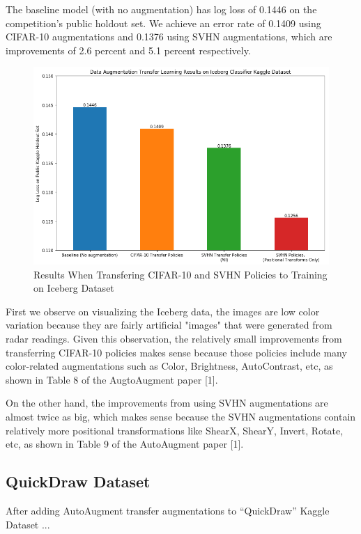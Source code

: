 \documentclass[10pt,twocolumn,letterpaper]{article}
\begin{document}
The baseline model (with no augmentation) has log loss of 0.1446 on the competition's public holdout set. We achieve an error rate of 0.1409 using CIFAR-10 augmentations and 0.1376 using SVHN augmentations, which are improvements of 2.6 percent and 5.1 percent respectively.

\begin{figure}[bhp]
\includegraphics[width=\columnwidth]{iceberg_results.png}
\caption{Results When Transfering CIFAR-10 and SVHN Policies to Training on Iceberg Dataset}
\end{figure}

First we observe on visualizing the Iceberg data, the images are low color variation because they are fairly artificial "images" that were generated from radar readings. Given this observation, the relatively small improvements from transferring CIFAR-10 policies makes sense because those policies include many color-related augmentations such as Color, Brightness, AutoContrast, etc, as shown in Table 8 of the AugtoAugment paper [1].  

On the other hand, the improvements from using SVHN augmentations are almost twice as big, which makes sense because the SVHN augmentations contain relatively more positional transformations like ShearX, ShearY, Invert, Rotate, etc, as shown in Table 9 of the AutoAugment paper [1].  



\subsection{QuickDraw Dataset}

After adding AutoAugment transfer augmentations to “QuickDraw” Kaggle Dataset ...
\end{document}
